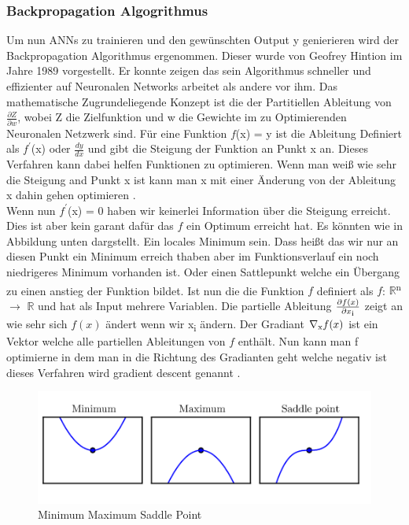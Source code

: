 \documentclass{llncs}
\begin{document}
\subsubsection{Backpropagation Algogrithmus}

Um nun ANNs zu trainieren und den gewünschten Output y genierieren wird der Backpropagation Algorithmus ergenommen. Dieser wurde von Geofrey Hintion im Jahre 1989 vorgestellt\cite{backpro}. Er konnte zeigen das sein Algorithmus schneller und effizienter auf Neuronalen Networks arbeitet als andere vor ihm. Das mathematische Zugrundeliegende Konzept ist die der Partitiellen Ableitung von  $\frac{\partial Z}{\partial w}$, wobei Z die Zielfunktion und w die Gewichte im zu Optimierenden Neuronalen Netzwerk sind. Für eine Funktion $f$(x) = y ist die Ableitung Definiert als $f^\prime$(x) oder $\frac{dy}{dx}$ und gibt die Steigung der Funktion an Punkt x an. Dieses Verfahren kann dabei helfen Funktionen zu optimieren. Wenn man weiß wie sehr die Steigung and Punkt x ist kann man x mit einer Änderung von der Ableitung x dahin gehen optimieren \cite{Grundlagen}. \\
Wenn nun $f^\prime$(x) = 0 haben wir keinerlei Information über die Steigung erreicht. Dies ist aber kein garant dafür das $f$ ein Optimum erreicht hat.  Es könnten wie in Abbildung unten dargstellt. Ein locales Minimum sein. Dass heißt das wir nur an diesen Punkt ein Minimum erreich thaben aber im Funktionsverlauf ein noch niedrigeres Minimum vorhanden ist. Oder einen Sattlepunkt welche ein Übergang zu einen anstieg der Funktion bildet.
Ist nun die die Funktion $f$ definiert als $f$: $\mathbb{R}$\textsuperscript{n} $\rightarrow$  $\mathbb{R}$ und hat als Input mehrere Variablen. Die partielle Ableitung $\frac{\partial f(x)}{\partial x\textsubscript{i}}$ zeigt an wie sehr sich $f(x)$ ändert wenn wir x\textsubscript{i} ändern. Der Gradiant $\nabla\textsubscript{x}f(x)$ ist ein Vektor welche alle partiellen Ableitungen von $f$ enthält. Nun kann man f optimierne in dem man in die Richtung des Gradianten geht welche negativ ist dieses Verfahren wird gradient descent genannt \cite{Grundlagen}.
\begin{figure}[htbp] 
	\centering
	\includegraphics[width=1.0\textwidth]{saddle.png}
	\caption{Minimum Maximum Saddle Point}
	\label{fig:Bild1}
\end{figure}
\end{document}
